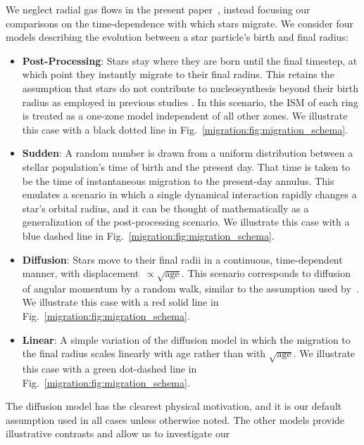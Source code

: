 We neglect radial gas flows in the present paper~\citep{Bilitewski2012, 
Lacey1985}, instead focusing our comparisons on the time-dependence with which 
stars migrate. 
We consider four models describing the evolution between a star particle's 
birth and final radius: 
\begin{itemize} 
	\item \textbf{Post-Processing}: Stars stay where they are born until the 
	final timestep, at which point they instantly migrate to their final 
	radius. 
	This retains the assumption that stars do not contribute to nucleosynthesis 
	beyond their birth radius as employed in previous studies 
	\citep[e.g.][]{Minchev2013}. 
	In this scenario, the ISM of each ring is treated as a one-zone model 
	independent of all other zones. We illustrate this case with a black dotted 
	line in Fig.~\ref{migration:fig:migration_schema}. 

	\item \textbf{Sudden}: A random number is drawn from a uniform distribution 
	between a stellar population's time of birth and the present day. 
	That time is taken to be the time of instantaneous migration to the 
	present-day annulus. 
	This emulates a scenario in which a single dynamical interaction rapidly 
	changes a star's orbital radius, and it can be thought of mathematically as 
	a generalization of the post-processing scenario. 
	We illustrate this case with a blue dashed line in 
	Fig.~\ref{migration:fig:migration_schema}. 

	\item \textbf{Diffusion}: Stars move to their final radii in a continuous, 
	time-dependent manner, with displacement~$\propto \sqrt{\text{age}}$. 
	This scenario corresponds to diffusion of angular momentum by a random 
	walk, similar to the assumption used by~\citet{Frankel2018, Frankel2020}. 
	We illustrate this case with a red solid line in 
	Fig.~\ref{migration:fig:migration_schema}. 

	\item \textbf{Linear}: A simple variation of the diffusion model in which 
	the migration to the final radius scales linearly with age rather than with 
	$\sqrt{\text{age}}$. We illustrate this case with a green dot-dashed line 
	in Fig.~\ref{migration:fig:migration_schema}. 
\end{itemize} 
The diffusion model has the clearest physical motivation, and it is our default 
assumption used in all cases unless otherwise noted. 
The other models provide illustrative contrasts and allow us to investigate our 
